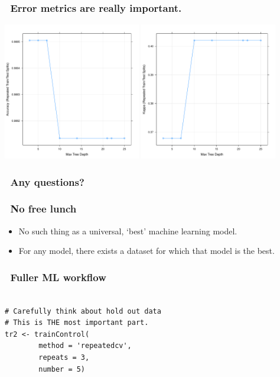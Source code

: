 \documentclass[handout, aspectratio = 169]{beamer}
\begin{document}
\begin{frame}
\frametitle{\insertframenumber~Error metrics are really important.}

    \includegraphics[width = 0.45\textwidth]{rpart_acc.pdf}%
    \includegraphics[width = 0.45\textwidth]{rpart_kappa.pdf}

\end{frame} 


\begin{frame}
\frametitle{\insertframenumber~Any questions?}


\end{frame} 



\begin{frame}
\frametitle{\insertframenumber~No free lunch}
\begin{itemize}
\item No such thing as a universal, `best' machine learning model.
\item For any model, there exists a dataset for which that model is the best.
\end{itemize}

\end{frame} 




\begin{frame}[fragile]
\frametitle{\insertframenumber~Fuller ML workflow}
\begin{Verbatim}

# Carefully think about hold out data
# This is THE most important part.
tr2 <- trainControl(
        method = 'repeatedcv',
        repeats = 3,
        number = 5)

\end{Verbatim}

\end{frame} 
\end{document}
